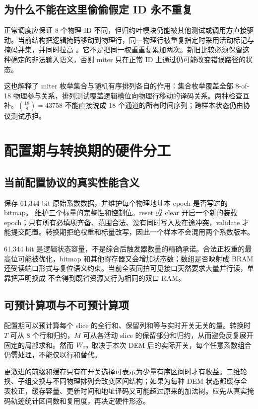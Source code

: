\subsection{为什么不能在这里偷偷假定 ID 永不重复}
正常调度应保证 8 个物理 ID 不同，但归约叶模块仍能被其他测试或调用方直接驱动。当前结构把逻辑掩码移动到物理行，同一物理行被重复指定时采用活动标记与掩码并集，并同时拉高 。它不是把同一权重重复累加两次。新旧比较必须保留这种确定的非法输入语义，否则 miter 只在正常 ID 上通过仍可能改变错误路径的状态。

这也解释了 miter 枚举集合与随机有序排列各自的作用：集合枚举覆盖全部 8-of-18 物理参与关系，排列测试覆盖逻辑槽位向物理行移动的译码关系。两种检查互补。\(\binom{18}{8}=43758\) 不能直接说成 18 个通道的所有时间序列；跨样本状态仍由协议测试承担。

\section{配置期与转换期的硬件分工}
\subsection{当前配置协议的真实性能含义}
 保存 61,344 bit 原始系数数据，并维护每个物理地址本 epoch 是否写过的 bitmap。 维护三个标量的完整性和控制位。reset 或 clear 开启一个新的装载 epoch；只有所有必填项齐备、范围合法、没有同时写入及在途冲突，validate 才能提交配置。转换期拒绝权重和标量改写，因此一个样本不会混用两个系数版本。

61,344 bit 是逻辑状态容量，不是综合后触发器数量的精确承诺。合法正权重的最高位可能被优化，bitmap 和其他寄存器又会增加状态数；数组是否映射成 BRAM 还受读端口形式与复位语义约束。当前全表同拍可见接口天然要求大量并行读，单靠把声明换成  不会得到既省资源又行为相同的双口 RAM。

\subsection{可预计算项与不可预计算项}
配置期可以预计算每个 slice 的全行和、保留列和等与实时开关无关的量。转换时 \(T\) 可从 8 个行和归约，\(M\) 可从各活动 slice 的保留部分和归约，从而避免反复展开固定的局部求和。然而 \(W_{\rm on}\) 取决于本次 DEM 后的实际开关，每个任意系数组合仍需处理，不能仅以行和替代。

更激进的前缀和缓存只有在开关选择可表示为少量有序区间时才有收益。二维轮换、子组交换与不同物理排列会改变区间结构；如果为每种 DEM 状态都缓存全表校正，缓存容量、更新时间和地址译码又可能超过原来的加法树。应先从真实掩码轨迹统计区间数和复用度，再决定硬件形态。

